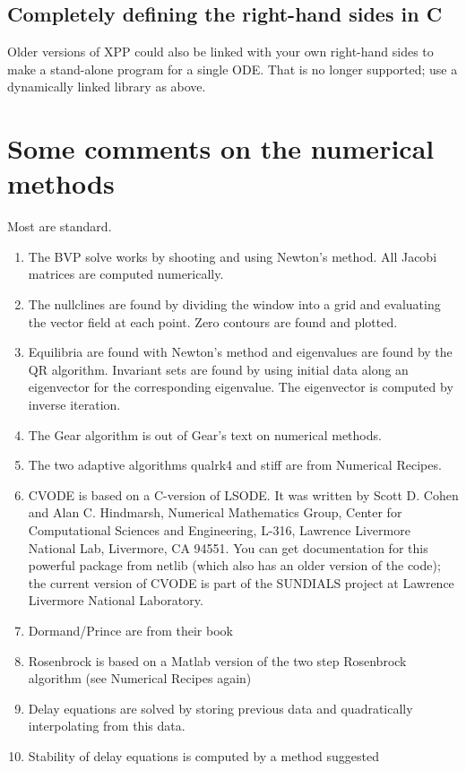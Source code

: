 \documentclass{article}
\begin{document}
\subsection{Completely defining the right-hand sides in C} 

Older versions of XPP could also be linked with your own right-hand sides to make a stand-alone
program for a single ODE.  That is no longer supported; use a dynamically linked library as above.

\section{Some comments on the numerical methods}
Most are standard.   
\begin{enumerate} 
\item The BVP solve works 
by shooting and using Newton's method.  All Jacobi matrices are computed 
numerically.  
\item The nullclines are found by dividing the window into a grid and 
evaluating the vector field at each point.  Zero contours are found
and plotted. 
\item Equilibria are found with Newton's method and eigenvalues are found by the QR
 algorithm.  
Invariant sets are found by using initial data along an eigenvector
 for the corresponding eigenvalue.  The eigenvector is computed by inverse 
iteration. 
\item The Gear algorithm is out of Gear's text 
on numerical methods.
\item The two adaptive algorithms qualrk4 and stiff
 are from Numerical Recipes.
\item CVODE is based on a C-version of LSODE.  It was written by
Scott D. Cohen and Alan C. Hindmarsh, Numerical Mathematics Group,
Center for Computational Sciences and Engineering, L-316,
Lawrence Livermore National Lab, Livermore, CA 94551.
You can get documentation for this powerful package from netlib (which also has an
older version of the code); the current version of CVODE is part of the SUNDIALS project at
Lawrence Livermore National Laboratory.
\item Dormand/Prince are from their book
\item Rosenbrock is based on a Matlab version of the two step Rosenbrock
algorithm (see Numerical Recipes again)  
\item Delay equations are solved by storing previous data and 
quadratically  interpolating from this data.  
\item Stability of delay equations is computed by a method suggested

\end{enumerate}
\end{document}
